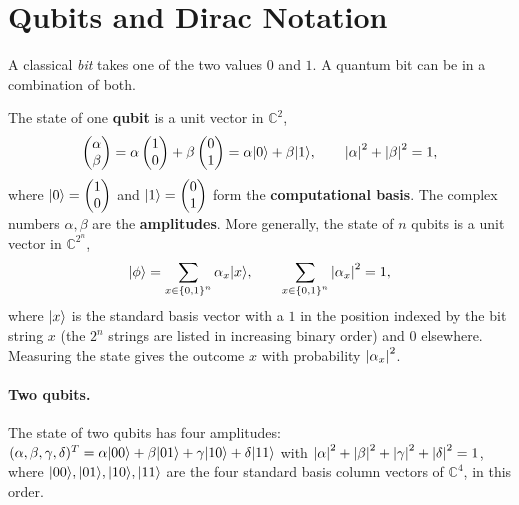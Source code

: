 
\section{Qubits and Dirac Notation}

A classical \emph{bit} takes one of the two values $0$ and $1$. A quantum bit can be in a combination
of both.

\begin{definition}\label{def:qubit-0915}
    The state of one \textbf{qubit} is a unit vector in $\mathbb{C}^2$,
    \[\begin{pmatrix} \alpha \\ \beta \end{pmatrix}
        = \alpha \begin{pmatrix} 1 \\ 0 \end{pmatrix} + \beta \begin{pmatrix} 0 \\ 1 \end{pmatrix}
        = \alpha \lvert 0 \rangle + \beta \lvert 1 \rangle,
        \qquad \left\lvert\alpha\right\rvert^2 + \left\lvert\beta\right\rvert^2 = 1,\]
    where $\lvert 0 \rangle = \begin{pmatrix} 1 \\ 0 \end{pmatrix}$ and
    $\lvert 1 \rangle = \begin{pmatrix} 0 \\ 1 \end{pmatrix}$ form the \textbf{computational basis}. The
    complex numbers $\alpha, \beta$ are the \textbf{amplitudes}. More generally, the state of $n$
    qubits is a unit vector in $\mathbb{C}^{2^n}$,
    \[\lvert \phi \rangle = \sum_{x \in \left\lbrace0,1\right\rbrace^n} \alpha_x \lvert x \rangle,
        \qquad \sum_{x \in \left\lbrace0,1\right\rbrace^n} \left\lvert\alpha_x\right\rvert^2 = 1,\]
    where $\lvert x \rangle$ is the standard basis vector with a $1$ in the position indexed by the bit string
    $x$ (the $2^n$ strings are listed in increasing binary order) and $0$ elsewhere. Measuring the
    state gives the outcome $x$ with probability $\left\lvert\alpha_x\right\rvert^2$.
\end{definition}

\paragraph{Two qubits.} The state of two qubits has four amplitudes:
$(\alpha, \beta, \gamma, \delta)^T = \alpha \lvert 00 \rangle + \beta \lvert 01 \rangle + \gamma \lvert 10 \rangle + \delta \lvert 11 \rangle$
with $\left\lvert\alpha\right\rvert^2 + \left\lvert\beta\right\rvert^2 + \left\lvert\gamma\right\rvert^2 + \left\lvert\delta\right\rvert^2 = 1$, where
$\lvert 00 \rangle, \lvert 01 \rangle, \lvert 10 \rangle, \lvert 11 \rangle$ are the four standard basis column vectors of
$\mathbb{C}^4$, in this order.

